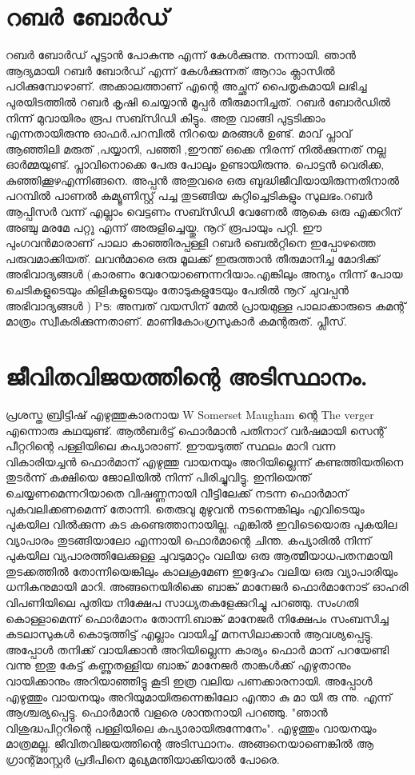 \documentclass[10pt,a4paper]{report}
\begin{document}
  \section{  റബർ ബോർഡ്}
  റബർ ബോർഡ് പൂട്ടാൻ പോകുന്നു എന്ന് കേൾക്കുന്നു. നന്നായി. ഞാൻ ആദ്യമായി റബർ ബോർഡ് എന്ന് കേൾക്കുന്നത് ആറാം ക്ലാസിൽ പഠിക്കുമ്പോഴാണ്. അക്കാലത്താണ് എന്റെ അച്ഛന് പൈതൃകമായി ലഭിച്ച പുരയിടത്തിൽ റബർ കൃഷി ചെയ്യാൻ മൂപ്പർ തീരുമാനിച്ചത്. റബർ ബോർഡിൽ നിന്ന് മുവായിരം രൂപ സബ്സിഡി കിട്ടും. അതു വാങ്ങി പുട്ടടിക്കാം എന്നതായിരുന്നു ഓഫർ.പറമ്പിൽ നിറയെ മരങ്ങൾ ഉണ്ട്. മാവ് പ്ലാവ് ആഞ്ഞിലി മരുത് ,പയ്യാനി, പഞ്ഞി ,ഈന്ത് ഒക്കെ നിരന്ന് നിൽക്കുന്നത് നല്ല ഓർമ്മയുണ്ട്. പ്ലാവിനൊക്കെ പേരു പോലും ഉണ്ടായിരുന്നു. പൊട്ടൻ വെരിക്ക, കുഞ്ഞിക്കൂഴഎന്നിങ്ങനെ. അപ്പൻ അതുവരെ ഒരു ബുദ്ധിജീവിയായിരുന്നതിനാൽ പറമ്പിൽ പാണൽ കമ്യൂണിസ്റ്റ് പച്ച തുടങ്ങിയ കുറ്റിച്ചെടികളും സുലഭം.റബർ ആപ്പിസർ വന്ന് എല്ലാം വെട്ടണം സബ്സിഡി വേണേൽ ആകെ ഒരു എക്കറിന് അഞ്ചു മരമേ പറ്റു എന്ന് അരുളിച്ചെയ്തു. നൂറ് രൂപായും പറ്റി. ഈ പുംഗവൻമാരാണ് പാലാ കാഞ്ഞിരപ്പള്ളി റബർ ബെൽറ്റിനെ ഇപ്പോഴത്തെ പരുവമാക്കിയത്. ലവൻമാരെ ഒരു മൂലക്ക് ഇരുത്താൻ തീരുമാനിച്ച മോദിക്ക് അഭിവാദ്യങ്ങൾ (കാരണം വേറേയാണെന്നറിയാം.എങ്കിലും അന്യം നിന്ന് പോയ ചെടികളുടെയും കിളികളുടെയും തോടുകളുടേയും പേരിൽ നൂറ് ചുവപ്പൻ അഭിവാദ്യങ്ങൾ ) Pട: അമ്പത് വയസിന് മേൽ പ്രായമുള്ള പാലാക്കാരുടെ കമന്റ് മാത്രം സ്വീകരിക്കുന്നതാണ്. മാണികോoഗ്രസുകാർ കമന്റരുത്. പ്ലീസ്.
 
    \section{ജീവിതവിജയത്തിന്റെ അടിസ്ഥാനം.}
    പ്രശസ്ത ബ്രിട്ടിഷ് എഴുത്തുകാരനായ W Somerset Maugham ന്റെ The verger എന്നൊരു കഥയുണ്ട്. ആൽബർട്ട് ഫൊർമാൻ പതിനാറ് വർഷമായി സെന്റ് പീറ്ററിന്റെ പള്ളിയിലെ കപ്യാരാണ്. ഈയടുത്ത് സ്ഥലം മാറി വന്ന വികാരിയച്ചൻ ഫൊർമാന് എഴുത്തു വായനയും അറിയില്ലെന്ന് കണ്ടത്തിയതിനെ തുടർന്ന് കക്ഷിയെ ജോലിയിൽ നിന്ന് പിരിച്ചുവിട്ടു. ഇനിയെന്ത് ചെയ്യണമെന്നറിയാതെ വിഷണ്ണനായി വീട്ടിലേക്ക് നടന്ന ഫൊർമാന് പുകവലിക്കണമെന്ന് തോന്നി. തെരുവു മുഴുവൻ നടന്നെങ്കിലും എവിടെയും പുകയില വിൽക്കുന്ന കട കണ്ടെത്താനായില്ല. എങ്കിൽ ഇവിടെയൊരു പുകയില വ്യാപാരം തുടങ്ങിയാലോ എന്നായി ഫൊർമാന്റെ ചിന്ത. കപ്യാരിൽ നിന്ന് പുകയില വ്യപാരത്തിലേക്കുള്ള ചുവടുമാറ്റം വലിയ ഒരു ആത്മീയാധപതനമായി തുടക്കത്തിൽ തോന്നിയെങ്കിലും കാലക്രമേണ ഇദ്ദേഹം വലിയ ഒരു വ്യാപാരിയും ധനികനുമായി മാറി. അങ്ങനെയിരിക്കെ ബാങ്ക് മാനേജർ ഫൊർമാനോട് ഓഹരി വിപണിയിലെ പുതിയ നിക്ഷേപ സാധ്യതകളേക്കുറിച്ചു പറഞ്ഞു. സംഗതി കൊള്ളാമെന്ന് ഫൊർമാനം തോന്നി.ബാങ്ക് മാനേജർ നിക്ഷേപം സംബസിച്ച കടലാസുകൾ കൊടുത്തിട്ട് എല്ലാം വായിച്ച് മനസിലാക്കാൻ ആവശ്യപ്പെട്ടു. അപ്പോൾ തനിക്ക് വായിക്കാൻ അറിയില്ലെന്ന കാര്യം ഫൊർ മാന് പറയേണ്ടി വന്നു ഇതു കേട്ട് കണ്ണുതള്ളിയ ബാങ്ക് മാനേജർ താങ്കൾക്ക് എഴുതാനും വായിക്കാനും അറിയാഞ്ഞിട്ടു കൂടി ഇത്ര വലിയ പണക്കാരനായി. അപ്പോൾ എഴുത്തും വായനയും അറിയുമായിരുന്നെങ്കിലോ എന്താ കു മാ യി രു ന്നു. എന്ന് ആശ്ചര്യപ്പെട്ടു. ഫൊർമാൻ വളരെ ശാന്തനായി പറഞ്ഞു. "ഞാൻ വിശുദ്ധപിറ്ററിന്റെ പള്ളിയിലെ കപ്യാരായിരുന്നേനേം". എഴുത്തും വായനയും മാത്രമല്ല. ജീവിതവിജയത്തിന്റെ അടിസ്ഥാനം. അങ്ങനെയാണെങ്കിൽ ആ ഗ്രാന്റ്മാസ്റ്റർ പ്രദീപിനെ മുഖ്യമന്തിയാക്കിയാൽ പോരെ.
    
\end{document}
